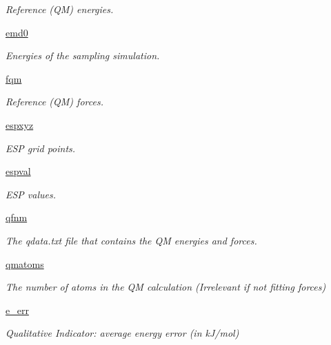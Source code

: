 \begin{DoxyCompactItemize}
\begin{DoxyCompactList}\small\item\em Reference (Q\-M) energies. \end{DoxyCompactList}\item 
\hyperlink{classforcebalance_1_1abinitio_1_1AbInitio_af928d333d14cb3b93f7db78530455873}{emd0}
\begin{DoxyCompactList}\small\item\em Energies of the sampling simulation. \end{DoxyCompactList}\item 
\hyperlink{classforcebalance_1_1abinitio_1_1AbInitio_af025be2ce97da3e8dc876d70e403f4ef}{fqm}
\begin{DoxyCompactList}\small\item\em Reference (Q\-M) forces. \end{DoxyCompactList}\item 
\hyperlink{classforcebalance_1_1abinitio_1_1AbInitio_a8be2d088afb344036aae989ca3cbcc41}{espxyz}
\begin{DoxyCompactList}\small\item\em E\-S\-P grid points. \end{DoxyCompactList}\item 
\hyperlink{classforcebalance_1_1abinitio_1_1AbInitio_aba6d885086d455fce8c3d472fd08020d}{espval}
\begin{DoxyCompactList}\small\item\em E\-S\-P values. \end{DoxyCompactList}\item 
\hyperlink{classforcebalance_1_1abinitio_1_1AbInitio_ac93db408472034937e79572bf872886c}{qfnm}
\begin{DoxyCompactList}\small\item\em The qdata.\-txt file that contains the Q\-M energies and forces. \end{DoxyCompactList}\item 
\hyperlink{classforcebalance_1_1abinitio_1_1AbInitio_af0760b8d33ce9dd044ccbe68fba7a1be}{qmatoms}
\begin{DoxyCompactList}\small\item\em The number of atoms in the Q\-M calculation (Irrelevant if not fitting forces) \end{DoxyCompactList}\item 
\hyperlink{classforcebalance_1_1abinitio_1_1AbInitio_aa569290969858e189935b3de37ead3f0}{e\-\_\-err}
\begin{DoxyCompactList}\small\item\em Qualitative Indicator\-: average energy error (in k\-J/mol) \end{DoxyCompactList}\item 

\end{DoxyCompactItemize}
